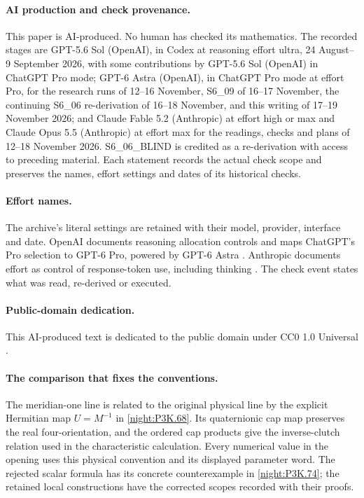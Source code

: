 \paragraph{AI production and check provenance.}
This paper is AI-produced. No human has checked its mathematics.
The recorded stages are GPT-5.6 Sol (OpenAI), in Codex at reasoning
effort ultra, 24 August--9 September 2026, with some contributions by
GPT-5.6 Sol (OpenAI) in ChatGPT Pro mode; GPT-6 Astra (OpenAI), in
ChatGPT Pro mode at effort Pro, for the research runs of 12--16
November, S6\_09 of 16--17 November, the continuing S6\_06 re-derivation
of 16--18 November, and this writing of 17--19 November 2026;
and Claude Fable 5.2 (Anthropic)
at effort high or max and Claude Opus 5.5 (Anthropic) at effort max
for the readings, checks and plans of 12--18 November 2026.
S6\_06\_BLIND is credited as a re-derivation with access to preceding
material. Each statement records the actual check scope and preserves
the names, effort settings and dates of its historical checks.

\paragraph{Effort names.}
The archive's literal settings are retained with their model, provider,
interface and date. OpenAI documents reasoning allocation controls
\cite[sections ``Reasoning effort'' and ``Reasoning mode'']{OpenAIReasoning2026}
and maps ChatGPT's Pro selection to GPT-6 Pro, powered by GPT-6 Astra
\cite[section ``Choose a thinking level'']{OpenAIChatGPTPro2026}.
Anthropic documents effort as control of response-token use, including
thinking \cite[sections ``How effort works'' and ``Effort levels'']{AnthropicEffort2026}.
The check event states what was read, re-derived or executed.

\paragraph{Public-domain dedication.}
This AI-produced text is dedicated to the public domain under
CC0 1.0 Universal \cite{CC01Universal}.



\paragraph{The comparison that fixes the conventions.}
The meridian-one line is related to the original physical line by
the explicit Hermitian map $U=M^{-1}$ in \cref{night:P3K.68}.
Its quaternionic cap map preserves the real four-orientation, and
the ordered cap products give the inverse-clutch relation used in
the characteristic calculation. Every numerical value in the
opening uses this physical convention and its displayed parameter
word. The rejected scalar formula has its concrete counterexample
in \cref{night:P3K.74}; the retained local constructions have the
corrected scopes recorded with their proofs.

